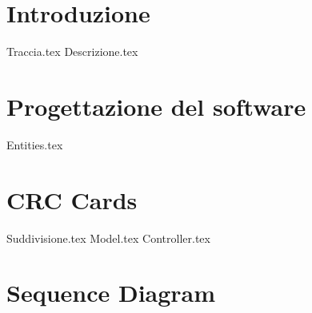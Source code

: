 \documentclass[a4paper, oneside, 10pt]{book}
\begin{document}
\chapter{Introduzione}
	{Traccia.tex}
	{Descrizione.tex}
\chapter{Progettazione del software}
	{Entities.tex}
\chapter{CRC Cards}
	{Suddivisione.tex}
	{Model.tex}
	{Controller.tex}
\chapter{Sequence Diagram}
\end{document}
